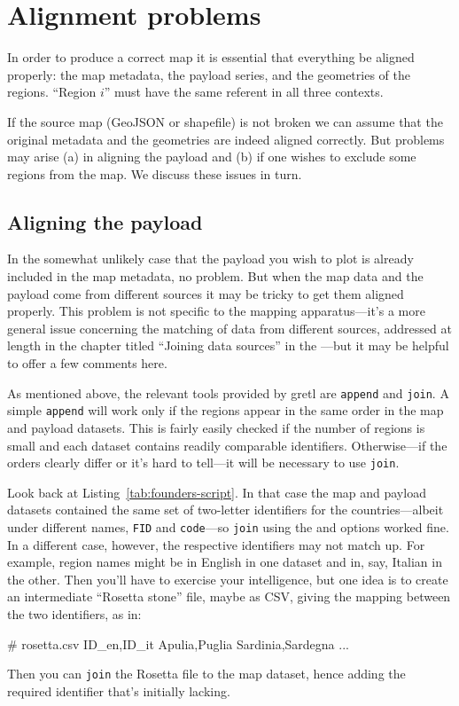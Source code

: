 \documentclass{article}
\begin{document}
\section{Alignment problems}
\label{sec:pairing}

In order to produce a correct map it is essential that everything be
aligned properly: the map metadata, the payload series, and the
geometries of the regions. ``Region $i$'' must have the same referent
in all three contexts.

If the source map (GeoJSON or shapefile) is not broken we can assume
that the original metadata and the geometries are indeed aligned
correctly. But problems may arise (a) in aligning the payload and (b)
if one wishes to exclude some regions from the map. We discuss these
issues in turn.

\subsection{Aligning the payload}

In the somewhat unlikely case that the payload you wish to plot is
already included in the map metadata, no problem. But when the map
data and the payload come from different sources it may be tricky to
get them aligned properly. This problem is not specific to the mapping
apparatus---it's a more general issue concerning the matching of data
from different sources, addressed at length in the chapter titled
``Joining data sources'' in the \GUG{}---but it may be helpful to
offer a few comments here.

As mentioned above, the relevant tools provided by gretl are
\texttt{append} and \texttt{join}. A simple \texttt{append} will work
only if the regions appear in the same order in the map and payload
datasets. This is fairly easily checked if the number of regions is
small and each dataset contains readily comparable
identifiers. Otherwise---if the orders clearly differ or it's hard to
tell---it will be necessary to use \texttt{join}.

Look back at Listing~\ref{tab:founders-script}. In that case the map
and payload datasets contained the same set of two-letter identifiers
for the countries---albeit under different names, \texttt{FID} and
\texttt{code}---so \texttt{join} using the  and
 options worked fine. In a different case, however, the
respective identifiers may not match up. For example, region names
might be in English in one dataset and in, say, Italian in the
other. Then you'll have to exercise your intelligence, but one idea is
to create an intermediate ``Rosetta stone'' file, maybe as CSV, giving
the mapping between the two identifiers, as in:
\begin{code}
# rosetta.csv
ID_en,ID_it
Apulia,Puglia
Sardinia,Sardegna
...
\end{code}
Then you can \texttt{join} the Rosetta file to the map dataset, hence
adding the required identifier that's initially lacking.
\end{document}
